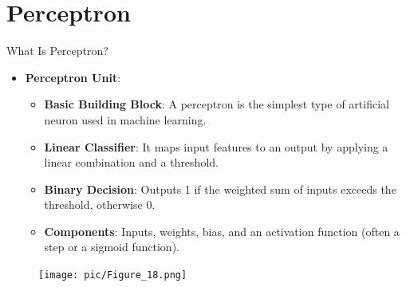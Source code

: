 \documentclass[serif, aspectratio=169]{beamer}
\begin{document}
\section{Perceptron}

\begin{frame}{What Is Perceptron?}
    \begin{itemize}
        \item \textbf{Perceptron Unit}:
        \medskip
        \begin{itemize}\itemsep1em
        \item \justifying \textbf{Basic Building Block}:
        A perceptron is the simplest type of artificial neuron used in machine learning.
        \item \justifying \textbf{Linear Classifier}:
        It maps input features to an output by applying a linear combination and a threshold.
        \item \justifying \textbf{Binary Decision}:
        Outputs 1 if the weighted sum of inputs exceeds the threshold, otherwise 0.
        \item \justifying \textbf{Components}:
        Inputs, weights, bias, and an activation function (often a step or a sigmoid function).
        \end{itemize}
    \end{itemize}
    \endminipage
    \hfill
    \begin{figure}
        \centering
        \texttt{[image: pic/Figure\_18.png]}
    \end{figure}
    \endminipage
    \vfill
\end{frame}
\end{document}
